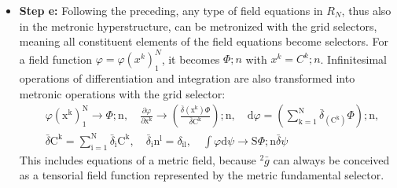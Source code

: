 \documentclass[12pt]{article}
\begin{document}
\begin{itemize}
\begin{itemize}
        \begin{equation}
\mathrm{F_i};\mathrm{n} = \underset{\gamma^\mathrm{i}=0}{\overset{\mathrm{n_i}}{\mathrm{S}}} \int_{\Omega_\mathrm{i}} \overline{||}_{\mathrm{l}=1}^\mathrm{p} \mathrm{d}\xi^\mathrm{l}_{(\mathrm{i})} \bar{\delta}\gamma^\mathrm{i}, \quad 1 \le \mathrm{i} \le \mathrm{L} \ge \mathrm{N}, \quad \tau \mathrm{c_i} \left( (\ )^\mathrm{l}_{(\mathrm{i})} \right)_1^\mathrm{p} = \mathrm{F_i}(\mathrm{C_k})_1^\mathrm{N} \tag{88}
\end{equation}
        which completes the metronization of the \( R_N \), expressing all selectors determining the hyperstructure explicitly by the grid selectors \( C_k \), containing all properties of the selective semantic iterator.
        \item \textbf{Step e:} Following the preceding, any type of field equations in \( R_N \), thus also in the metronic hyperstructure, can be metronized with the grid selectors, meaning all constituent elements of the field equations become selectors. For a field function \( \varphi = \varphi(x^k)_1^N \), it becomes \( \Phi ; n \) with \( x^k = C^k ; n \). Infinitesimal operations of differentiation and integration are also transformed into metronic operations with the grid selector:
        \begin{equation}
        \begin{aligned}
        & \varphi(\mathrm{x^k})_1^\mathrm{N} \to \Phi;\mathrm{n}, \quad \frac{\partial \varphi}{\partial \mathrm{x^k}} \to \left( \frac{\bar{\delta}(\mathrm{x^k})\Phi}{\bar{\delta}\mathrm{C^k}} \right);\mathrm{n}, \quad \mathrm{d}\varphi = \left( \sum_{\mathrm{k}=1}^\mathrm{N} \bar{\delta}_{(\mathrm{C^k})} \Phi \right);\mathrm{n}, \\
        & \bar{\delta}\mathrm{C^k} = \sum_{\mathrm{i}=1}^\mathrm{N} \bar{\delta}_\mathrm{i} \mathrm{C^k}, \quad \bar{\delta}_\mathrm{i}\mathrm{n^l} = \delta_{\mathrm{il}}, \quad \int \varphi \mathrm{d}\psi \to \mathrm{S}\Phi;\mathrm{n}\bar{\delta}\psi
        \end{aligned} \tag{88a}
        \end{equation}
        This includes equations of a metric field, because \( {}^2\bar{g} \) can always be conceived as a tensorial field function represented by the metric fundamental selector.
    \end{itemize}


\end{itemize}
\end{document}
